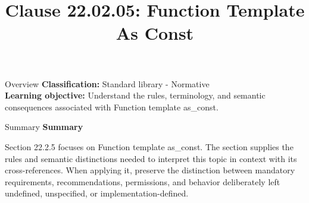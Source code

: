 \documentclass[10pt,letterpaper]{article}
\title{Clause 22.02.05: Function Template As Const}
\author{}
\date{}
\begin{document}
\maketitle
\begin{CornellOverviewBox}{Overview}
\textbf{Classification:} Standard library - Normative\\[2pt]
\textbf{Learning objective:} Understand the rules, terminology, and semantic consequences associated with Function template as\_const.
\end{CornellOverviewBox}\begin{CornellSummaryBox}{Summary}
{\sffamily\bfseries\color{Accent} Summary}\par\vspace{3pt}Section 22.2.5 focuses on Function template as\_const. The section supplies the rules and semantic distinctions needed to interpret this topic in context with its cross-references. When applying it, preserve the distinction between mandatory requirements, recommendations, permissions, and behavior deliberately left undefined, unspecified, or implementation-defined.
\end{CornellSummaryBox}
\end{document}
